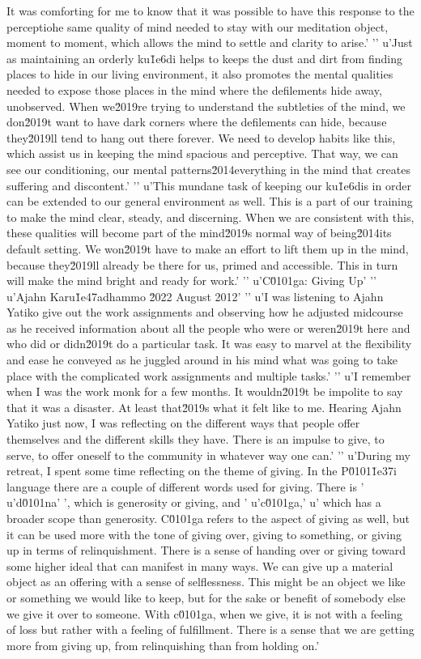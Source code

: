 It was comforting for me to know that it was possible to have this 
response to the perceptiohe same quality of mind needed to stay with our meditation object, moment to moment, which allows the mind to settle and clarity to arise.'
'\n'
u'Just as maintaining an orderly ku\u1e6di helps to keeps the dust and dirt from finding places to hide in our living environment, it also promotes the mental qualities needed to expose those places in the mind where the defilements hide away, unobserved. When we\u2019re trying to understand the subtleties of the mind, we don\u2019t want to have dark corners where the defilements can hide, because they\u2019ll tend to hang out there forever. We need to develop habits like this, which assist us in keeping the mind spacious and perceptive. That way, we can see our conditioning, our mental patterns\u2014everything in the mind that creates suffering and discontent.'
'\n'
u'This mundane task of keeping our ku\u1e6dis in order can be extended to our general environment as well. This is a part of our training to make the mind clear, steady, and discerning. When we are consistent with this, these qualities will become part of the mind\u2019s normal way of being\u2014its default setting. We won\u2019t have to make an effort to lift them up in the mind, because they\u2019ll already be there for us, primed and accessible. This in turn will make the mind bright and ready for work.'
'\n'
u'C\u0101ga: Giving Up'
'\n'
u'Ajahn Karu\u1e47adhammo \u2022 August 2012'
'\n'
u'I was listening to Ajahn Yatiko give out the work assignments and observing how he adjusted midcourse as he received information about all the people who were or weren\u2019t here and who did or didn\u2019t do a particular task. It was easy to marvel at the flexibility and ease he conveyed as he juggled around in his mind what was going to take place with the complicated work assignments and multiple tasks.'
'\n'
u'I remember when I was the work monk for a few months. It wouldn\u2019t be impolite to say that it was a disaster. At least that\u2019s what it felt like to me. Hearing Ajahn Yatiko just now, I was reflecting on the different ways that people offer themselves and the different skills they have. There is an impulse to give, to serve, to offer oneself to the community in whatever way one can.'
'\n'
u'During my retreat, I spent some time reflecting on the theme of giving. In the P\u0101\u1e37i language there are a couple of different words used for giving. There is '
u'd\u0101na'
', which is generosity or giving, and '
u'c\u0101ga,'
u' which has a broader scope than generosity. C\u0101ga refers to the aspect of giving as well, but it can be used more with the tone of giving over, giving to something, or giving up in terms of relinquishment. There is a sense of handing over or giving toward some higher ideal that can manifest in many ways. We can give up a material object as an offering with a sense of selflessness. This might be an object we like or something we would like to keep, but for the sake or benefit of somebody else we give it over to someone. With c\u0101ga, when we give, it is not with a feeling of loss but rather with a feeling of fulfillment. There is a sense that we are getting more from giving up, from relinquishing than from holding on.'
